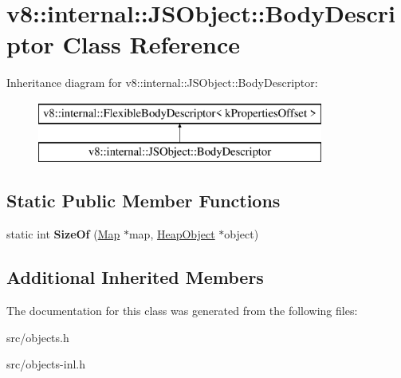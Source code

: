 \hypertarget{classv8_1_1internal_1_1_j_s_object_1_1_body_descriptor}{}\section{v8\+:\+:internal\+:\+:J\+S\+Object\+:\+:Body\+Descriptor Class Reference}
\label{classv8_1_1internal_1_1_j_s_object_1_1_body_descriptor}
Inheritance diagram for v8\+:\+:internal\+:\+:J\+S\+Object\+:\+:Body\+Descriptor\+:\begin{figure}[H]
\begin{center}
\leavevmode
\includegraphics[height=2.000000cm]{classv8_1_1internal_1_1_j_s_object_1_1_body_descriptor}
\end{center}
\end{figure}
\subsection*{Static Public Member Functions}
\begin{DoxyCompactItemize}
\item 
\hypertarget{classv8_1_1internal_1_1_j_s_object_1_1_body_descriptor_a69b9ca35c3bee05cc8fb35330b9c2d0e}{}static int {\bfseries Size\+Of} (\hyperlink{classv8_1_1internal_1_1_map}{Map} $\ast$map, \hyperlink{classv8_1_1internal_1_1_heap_object}{Heap\+Object} $\ast$object)\label{classv8_1_1internal_1_1_j_s_object_1_1_body_descriptor_a69b9ca35c3bee05cc8fb35330b9c2d0e}

\end{DoxyCompactItemize}
\subsection*{Additional Inherited Members}


The documentation for this class was generated from the following files\+:\begin{DoxyCompactItemize}
\item 
src/objects.\+h\item 
src/objects-\/inl.\+h\end{DoxyCompactItemize}
